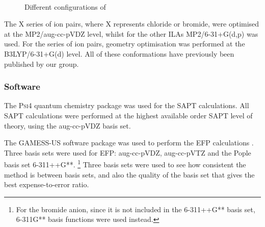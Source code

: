 \begin{figure}
    \centering
    \mbox{
    }
    \mbox{
    }                                 
    \mbox{                            
    }
    \caption{Different configurations of \protect{} \label{fig:conf-c2mpyr-ntf2}}
\end{figure}



The X series of ion pairs, where X represents chloride or bromide, were optimised at the MP2/aug-cc-pVDZ level, whilst for the other ILAs MP2/6-31+G(d,p) was used.
For the  series of ion pairs, geometry optimisation was performed at the B3LYP/6-31+G(d) level.
All of these conformations have previously been published by our group.
\cite{Izgorodina2014a, Rigby2014a}


\subsubsection{Software}

The \textsc{Psi4} quantum chemistry package was used for the SAPT calculations. 
\cite{Turney2012a}
All SAPT calculations were performed at the highest available order SAPT level of theory, using the aug-cc-pVDZ basis set.
\cite{Izgorodina2014a}


The GAMESS-US software package was used to perform the EFP calculations
\cite{Schmidt1993a, Gordon2005a}.
Three basis sets were used for EFP: aug-cc-pVDZ, aug-cc-pVTZ and the Pople basis set 6-311++G**. 
\footnote{For the bromide anion, since it is not included in the 6-311++G** basis set, 6-311G** basis functions were used instead.}
Three basis sets were used to see how consistent the method is between basis sets, and also the quality of the basis set that gives the best expense-to-error ratio.

